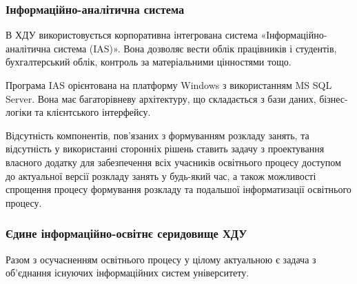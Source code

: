 \subsubsection{Інформаційно-аналітична система} \label{subs:ias}

В ХДУ використовується корпоративна інтегрована система «Інформаційно-аналітична система (IAS)». Вона дозволяє вести облік працівників і студентів, бухгалтерський облік, контроль за матеріальними цінностями тощо. 
		
Програма IAS орієнтована на платформу Windows з використанням MS SQL Server. Вона має багаторівневу архітектуру, що складається з бази даних, бізнес-логіки та клієнтського інтерфейсу.

Відсутність компонентів, пов’язаних з формуванням розкладу занять, та відсутність у використанні сторонніх рішень ставить задачу з проектування власного додатку для забезпечення всіх учасників освітнього процесу доступом до актуальної версії розкладу занять у будь-який час, а також можливості спрощення процесу формування розкладу та подальшої інформатизації освітнього процесу.

\subsubsection{Єдине інформаційно-освітнє серидовище ХДУ}

Разом з осучасненням освітнього процесу у цілому актуальною є задача з об'єднання існуючих інформаційних систем університету.

